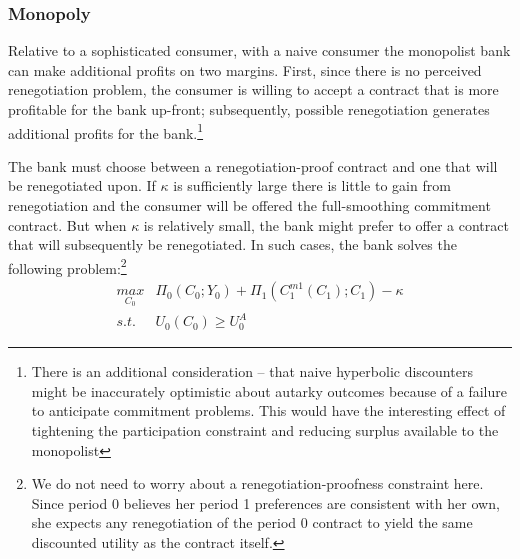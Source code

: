 \documentclass[11pt,english]{article}
\theoremstyle{plain}
\theoremstyle{definition}
\begin{document}
\subsubsection{Monopoly}

Relative to a sophisticated consumer, with a naive consumer the monopolist
bank can make additional profits on two margins. First, since there
is no perceived renegotiation problem, the consumer is willing to
accept a contract that is more profitable for the bank up-front; subsequently,
possible renegotiation generates additional profits for the bank.\footnote{There is an additional consideration -- that naive hyperbolic discounters might be inaccurately optimistic about autarky outcomes because of a failure to anticipate commitment problems. This would have the interesting effect of tightening the participation constraint and reducing surplus available to the monopolist}

The bank must choose between a renegotiation-proof contract and one
that will be renegotiated upon. If $\kappa$ is sufficiently large
there is little to gain from renegotiation and the consumer will be
offered the full-smoothing commitment contract. But when $\kappa$
is relatively small, the bank might prefer to offer a contract that
will subsequently be renegotiated. In such cases, the bank solves
the following problem:\footnote{We do not need to worry about a renegotiation-proofness constraint
here. Since period 0 believes her period 1 preferences are consistent
with her own, she expects any renegotiation of the period 0 contract
to yield the same discounted utility as the contract itself.} 
\begin{eqnarray}
\underset{C_{0}}{max} & \Pi_{0}\left(C_{0};Y_{0}\right)+\Pi_{1}\left(C_{1}^{m1}\left(C_{1}\right);C_{1}\right)-\kappa\nonumber \\
s.t. & U_{0}\left(C_{0}\right)\geq U_{0}^{A}\label{eq:pc-n}
\end{eqnarray}
\end{document}
